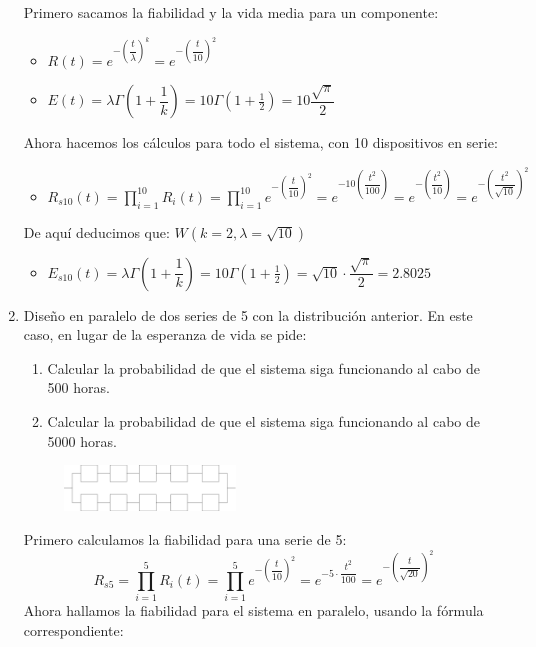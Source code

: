 \begin{enumerate}
\begin{tcolorbox}[colback=white,colframe=cyan!50!black,fonttitle=\bfseries]
    Primero sacamos la fiabilidad y la vida media para un componente:
    \begin{itemize}
        \item $R(t)= e^{-(\dfrac{t}{\lambda})^k}= e^{-(\dfrac{t}{10})^2}$
        \item $E(t) = \lambda \Gamma (1+\dfrac{1}{k})= 10\Gamma(1+\frac{1}{2})=10\dfrac{\sqrt{\pi}}{2}$
    \end{itemize}
    Ahora hacemos los cálculos para todo el sistema, con 10 dispositivos en serie:
    \begin{itemize}
        \item $R_{s10}(t)=\prod_{i=1}^{10}R_i(t)=\prod_{i=1}^{10} e^{-(\dfrac{t}{10})^2}= e^{-10(\dfrac{t^2}{100})}= e^{-(\dfrac{t^2}{10})}= e^{-(\dfrac{t^2}{\sqrt{10}})^2}$
    \end{itemize}
    De aquí deducimos que: $W(k=2, \lambda=\sqrt{10})$
    \begin{itemize}
        \item $E_{s10}(t) = \lambda \Gamma (1+\dfrac{1}{k})= 10\Gamma(1+\frac{1}{2})=\sqrt{10}\cdot \dfrac{\sqrt{\pi}}{2}=2.8025$
    \end{itemize}
    \end{tcolorbox}
    \item Diseño en paralelo de dos series de 5 con la distribución anterior. En este  caso, en lugar de la esperanza de vida se pide:
    \begin{enumerate}
        \item Calcular la probabilidad de que el sistema siga funcionando al cabo de 500 horas.
        \item Calcular la probabilidad de que el sistema siga funcionando al cabo de 5000 horas.
    \end{enumerate}
    \begin{tcolorbox}[colback=white,colframe=cyan!50!black,fonttitle=\bfseries]
        \begin{figure}[H]
            \centering
            \includegraphics[width=0.43\textwidth]{Images/P2S5.png}
        \end{figure}
        Primero calculamos la fiabilidad para una serie de 5:
        \[R_{s5}=\prod_{i=1}^{5}R_i(t)=\prod_{i=1}^{5}e^{-(\dfrac{t}{10})^2}=e^{-5\cdot \dfrac{t^2}{100}}=e^{-(\dfrac{t}{\sqrt{20}})^2}
        \]
        Ahora hallamos la fiabilidad para el sistema en paralelo, usando la fórmula correspondiente:

\end{tcolorbox}
\end{enumerate}
